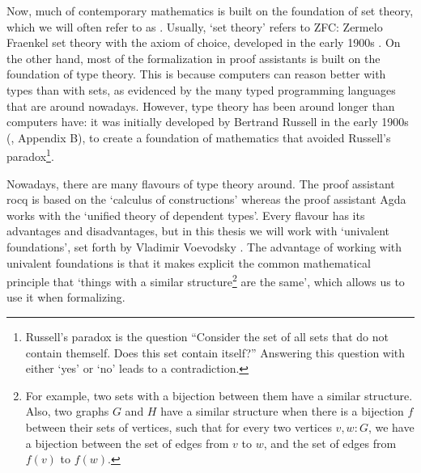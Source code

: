 Now, much of contemporary mathematics is built on the foundation of set theory, which we will often refer to as . Usually, `set theory' refers to ZFC: Zermelo Fraenkel set theory with the axiom of choice, developed in the early 1900s \autocite{Zermelo-set-theory}. On the other hand, most of the formalization in proof assistants is built on the foundation of type theory. This is because computers can reason better with types than with sets, as evidenced by the many typed programming languages that are around nowadays. However, type theory has been around longer than computers have: it was initially developed by Bertrand Russell in the early 1900s (\autocite{Russell-type-theory}, Appendix B), to create a foundation of mathematics that avoided Russell's paradox\footnote{Russell's paradox is the question ``Consider the set of all sets that do not contain themself. Does this set contain itself?'' Answering this question with either `yes' or `no' leads to a contradiction.}.

Nowadays, there are many flavours of type theory around. The proof assistant rocq is based on the `calculus of constructions' whereas the proof assistant Agda works with the `unified theory of dependent types'. Every flavour has its advantages and disadvantages, but in this thesis we will work with `univalent foundations', set forth by Vladimir Voevodsky \autocite{voevodsky-univalent-foundations}. The advantage of working with univalent foundations is that it makes explicit the common mathematical principle that `things with a similar structure\footnote{For example, two sets with a bijection between them have a similar structure. Also, two graphs $ G $ and $ H $ have a similar structure when there is a bijection $ f $ between their sets of vertices, such that for every two vertices $ v, w : G $, we have a bijection between the set of edges from $ v $ to $ w $, and the set of edges from $ f(v) $ to $ f(w) $.} are the same', which allows us to use it when formalizing.

